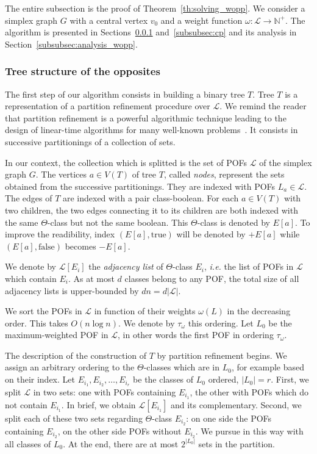 \documentclass[a4paper,UKenglish,numberwithinsect,cleveref, autoref]{lipics-v2021}
\newcommand{\card}[1]{\left| #1 \right|}
\begin{document}
The entire subsection is the proof of Theorem~\ref{th:solving_wopp}. We consider a simplex graph $G$ with a central vertex $v_0$ and a weight function $\omega : \mathcal{L} \rightarrow \mathbb{N}^+$. The algorithm is presented in Sections~\ref{subsubsec:tree_opp} and~\ref{subsubsec:cp} and its analysis in Section~\ref{subsubsec:analysis_wopp}.

\subsubsection{Tree structure of the opposites} \label{subsubsec:tree_opp}

The first step of our algorithm consists in building a binary tree $T$. Tree $T$ is a representation of a partition refinement procedure over $\mathcal{L}$. We remind the reader that partition refinement is a powerful algorithmic technique leading to the design of linear-time algorithms for many well-known problems~\cite{HaPaVi99,PaTa87}. It consists in successive partitionings of a collection of sets.

In our context, the collection which is splitted is the set of POFs $\mathcal{L}$ of the simplex graph $G$. The vertices $a \in V(T)$ of tree $T$, called \textit{nodes}, represent the sets obtained from the successive partitionings. They are indexed with POFs $L_a \in \mathcal{L}$. The edges of $T$ are indexed with a pair class-boolean. For each $a \in V(T)$ with two children, the two edges connecting it to its children are both indexed with the same $\Theta$-class but not the same boolean. This $\Theta$-class is denoted by $E\left[a\right]$. To improve the readibility, index $(E\left[a\right],\mbox{true})$ will be denoted by $+E\left[a\right]$ while $(E\left[a\right],\mbox{false})$ becomes $-E\left[a\right]$.

We denote by $\mathcal{L}\left[E_i\right]$ the \textit{adjacency list} of $\Theta$-class $E_i$, {\em i.e.} the list of POFs in $\mathcal{L}$ which contain $E_i$. As at most $d$ classes belong to any POF, the total size of all adjacency lists is upper-bounded by $dn = d\card{\mathcal{L}}$.

We sort the POFs in $\mathcal{L}$ in function of their weights $\omega(L)$ in the decreasing order. This takes $O(n\log n)$. We denote by $\tau_{\omega}$ this ordering. Let $L_0$ be the maximum-weighted POF in $\mathcal{L}$, in other words the first POF in ordering $\tau_{\omega}$.

The description of the construction of $T$ by partition refinement begins. We assign an arbitrary ordering to the $\Theta$-classes which are in $L_0$, for example based on their index. Let $E_{i_1}, E_{i_2},\ldots, E_{i_r}$ be the classes of $L_0$ ordered, $\card{L_0} = r$. First, we split $\mathcal{L}$ in two sets: one with POFs containing $E_{i_1}$, the other with POFs which do not contain $E_{i_1}$. In brief, we obtain $\mathcal{L}\left[E_{i_1}\right]$ and its complementary. Second, we split each of these two sets regarding $\Theta$-class $E_{i_2}$: on one side the POFs containing $E_{i_2}$, on the other side POFs without $E_{i_2}$. We pursue in this way with all classes of $L_0$. At the end, there are at most $2^{\card{L_0}}$ sets in the partition.
\end{document}
